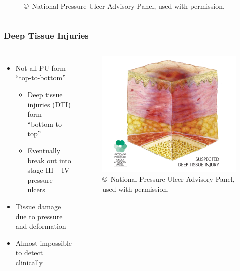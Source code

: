 \documentclass{beamer}
\begin{document}
\begin{frame}
\begin{columns}[c]
\begin{figure}
						\caption{\copyright\ National Pressure Ulcer Advisory Panel, used with permission.}
					\end{figure}
			\end{columns}
		\end{frame}

		\begin{frame}
			\frametitle{Deep Tissue Injuries}
			\begin{columns}[c]
				\begin{itemize}
					\item Not all PU form ``top-to-bottom''
					\begin{itemize}
						\item Deep tissue injuries (\alert{DTI}) form ``bottom-to-top''
						\item Eventually break out into stage III -- IV pressure ulcers
					\end{itemize}

					\item Tissue damage due to pressure and deformation

					\item Almost impossible to detect clinically
				\end{itemize}

					\begin{figure}
						\centering
						\includegraphics[width=\textwidth]{../latex/assets/npuap/suspectedDTI.png}

						\caption{\copyright\ National Pressure Ulcer Advisory Panel, used with permission.}
					\end{figure}
			\end{columns}
		\end{frame}
\end{document}
